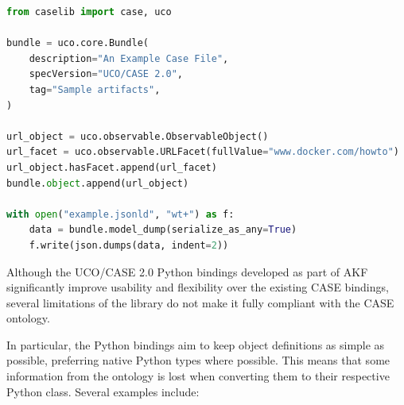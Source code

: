\documentclass[letterpaper,12pt]{report}
\begin{document}
\begin{lstlisting}[label={lst:b.3.e}, caption={Demonstration of bundle serialization using the AKF Python bindings for CASE}, language=Python]
from caselib import case, uco

bundle = uco.core.Bundle(
    description="An Example Case File",
    specVersion="UCO/CASE 2.0",
    tag="Sample artifacts",
)

url_object = uco.observable.ObservableObject()
url_facet = uco.observable.URLFacet(fullValue="www.docker.com/howto")
url_object.hasFacet.append(url_facet)
bundle.object.append(url_object)

with open("example.jsonld", "wt+") as f:
    data = bundle.model_dump(serialize_as_any=True)
    f.write(json.dumps(data, indent=2))
\end{lstlisting}

Although the UCO/CASE 2.0 Python bindings developed as part of AKF
significantly improve usability and flexibility over the existing CASE
bindings, several limitations of the library do not make it fully
compliant with the CASE ontology.

In particular, the Python bindings aim to keep object definitions as
simple as possible, preferring native Python types where possible. This
means that some information from the ontology is lost when converting
them to their respective Python class. Several examples include:
\end{document}
